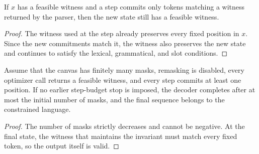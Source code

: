 \begin{proposition}
If $x$ has a feasible witness and a step commits only tokens matching a witness returned by the parser, then the new state still has a feasible witness.
\end{proposition}

\begin{proof}
The witness used at the step already preserves every fixed position in $x$. Since the new commitments match it, the witness also preserves the new state and continues to satisfy the lexical, grammatical, and slot conditions.
\end{proof}

\begin{proposition}[Termination]
Assume that the canvas has finitely many masks, remasking is disabled, every optimizer call returns a feasible witness, and every step commits at least one position. If no earlier step-budget stop is imposed, the decoder completes after at most the initial number of masks, and the final sequence belongs to the constrained language.
\end{proposition}

\begin{proof}
The number of masks strictly decreases and cannot be negative. At the final state, the witness that maintains the invariant must match every fixed token, so the output itself is valid.
\end{proof}

